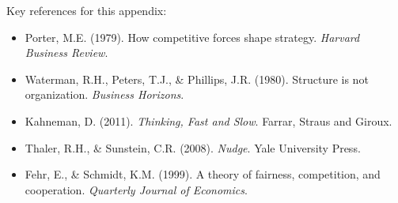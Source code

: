 Key references for this appendix:
\begin{itemize}[nosep]
    \item Porter, M.E. (1979). How competitive forces shape strategy. \textit{Harvard Business Review}.
    \item Waterman, R.H., Peters, T.J., \& Phillips, J.R. (1980). Structure is not organization. \textit{Business Horizons}.
    \item Kahneman, D. (2011). \textit{Thinking, Fast and Slow}. Farrar, Straus and Giroux.
    \item Thaler, R.H., \& Sunstein, C.R. (2008). \textit{Nudge}. Yale University Press.
    \item Fehr, E., \& Schmidt, K.M. (1999). A theory of fairness, competition, and cooperation. \textit{Quarterly Journal of Economics}.
\end{itemize}

\nocite{bcm_master}

